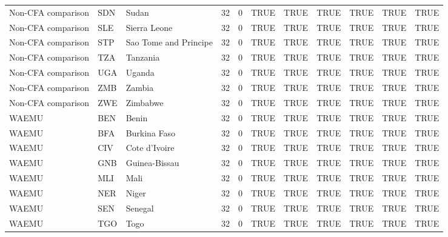 \begin{table}
\begin{tabular}[t]{lllrrllllll}
Non-CFA comparison & SDN & Sudan & 32 & 0 & TRUE & TRUE & TRUE & TRUE & TRUE & TRUE\\
Non-CFA comparison & SLE & Sierra Leone & 32 & 0 & TRUE & TRUE & TRUE & TRUE & TRUE & TRUE\\
Non-CFA comparison & STP & Sao Tome and Principe & 32 & 0 & TRUE & TRUE & TRUE & TRUE & TRUE & TRUE\\
\addlinespace
Non-CFA comparison & TZA & Tanzania & 32 & 0 & TRUE & TRUE & TRUE & TRUE & TRUE & TRUE\\
Non-CFA comparison & UGA & Uganda & 32 & 0 & TRUE & TRUE & TRUE & TRUE & TRUE & TRUE\\
Non-CFA comparison & ZMB & Zambia & 32 & 0 & TRUE & TRUE & TRUE & TRUE & TRUE & TRUE\\
Non-CFA comparison & ZWE & Zimbabwe & 32 & 0 & TRUE & TRUE & TRUE & TRUE & TRUE & TRUE\\
WAEMU & BEN & Benin & 32 & 0 & TRUE & TRUE & TRUE & TRUE & TRUE & TRUE\\
\addlinespace
WAEMU & BFA & Burkina Faso & 32 & 0 & TRUE & TRUE & TRUE & TRUE & TRUE & TRUE\\
WAEMU & CIV & Cote d'Ivoire & 32 & 0 & TRUE & TRUE & TRUE & TRUE & TRUE & TRUE\\
WAEMU & GNB & Guinea-Bissau & 32 & 0 & TRUE & TRUE & TRUE & TRUE & TRUE & TRUE\\
WAEMU & MLI & Mali & 32 & 0 & TRUE & TRUE & TRUE & TRUE & TRUE & TRUE\\
WAEMU & NER & Niger & 32 & 0 & TRUE & TRUE & TRUE & TRUE & TRUE & TRUE\\
\addlinespace
WAEMU & SEN & Senegal & 32 & 0 & TRUE & TRUE & TRUE & TRUE & TRUE & TRUE\\
WAEMU & TGO & Togo & 32 & 0 & TRUE & TRUE & TRUE & TRUE & TRUE & TRUE\\
\bottomrule
\end{tabular}
\end{table}